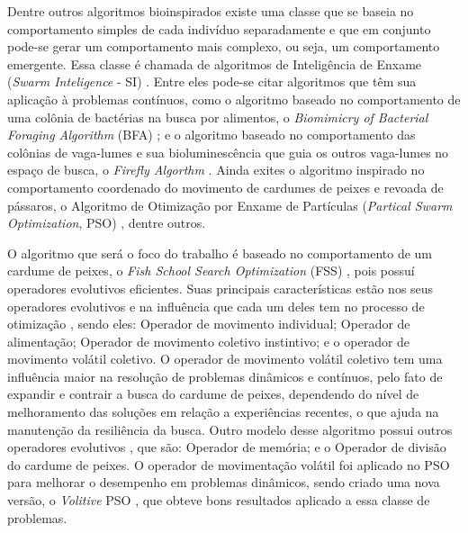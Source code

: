 Dentre outros algoritmos bioinspirados existe uma classe que se baseia no comportamento simples de cada indivíduo separadamente e que em conjunto pode-se gerar um comportamento mais complexo, ou seja, um comportamento emergente. Essa classe é chamada de algoritmos de Inteligência de Enxame (\textit{Swarm Inteligence} - SI) \cite{parpinelli2011new}. Entre eles pode-se citar algoritmos que têm sua aplicação à problemas contínuos, como o algoritmo baseado no comportamento de uma colônia de bactérias na busca por alimentos, o \textit{Biomimicry of Bacterial Foraging Algorithm} (BFA) \cite{passino2002biomimicry}; e o algoritmo baseado no comportamento das colônias de vaga-lumes e sua bioluminescência que guia os outros vaga-lumes no espaço de busca, o \textit{Firefly Algorthm} \cite{firefly}. Ainda exites o algoritmo inspirado no comportamento coordenado do movimento de cardumes de peixes e revoada de pássaros, o Algoritmo de Otimização por Enxame de Partículas (\textit{Partical Swarm Optimization}, PSO) \cite{pso}, dentre outros.

O algoritmo que será o foco do trabalho é baseado no comportamento de um cardume de peixes, o \textit{Fish School Search Optimization} (FSS) \cite{carmelo2008novel}, pois possuí operadores evolutivos eficientes. Suas principais características estão nos seus operadores evolutivos e na influência que cada um deles tem no processo de otimização \cite{c2009influence}, sendo eles: Operador de movimento individual; Operador de alimentação; Operador de movimento coletivo instintivo; e o operador de movimento volátil coletivo. O operador de movimento volátil coletivo tem uma influência maior na resolução de problemas dinâmicos e contínuos, pelo fato de expandir e contrair a busca do cardume de peixes, dependendo do nível de melhoramento das soluções em relação a experiências recentes, o que ajuda na manutenção da resiliência da busca. Outro modelo desse algoritmo possui outros operadores evolutivos \cite{madeiro2011density}, que são: Operador de memória; e o Operador de divisão do cardume de peixes. O operador de movimentação volátil foi aplicado no PSO para melhorar o desempenho em problemas dinâmicos, sendo criado uma nova versão, o \textit{Volitive} PSO \cite{cavalcanti2011hybrid}, que obteve bons resultados aplicado a essa classe de problemas.

